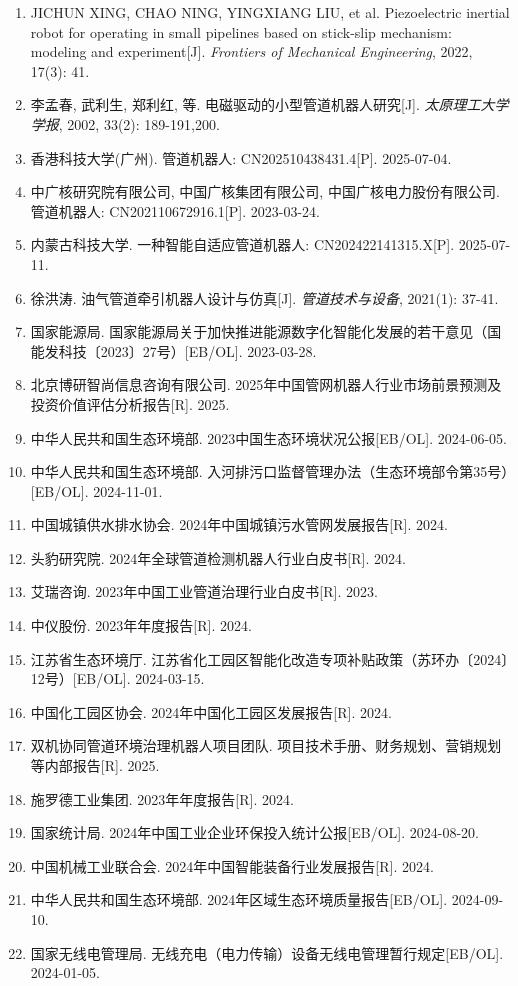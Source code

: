 \documentclass[12pt, a4paper]{article}
\begin{document}
\begin{enumerate}
    \item JICHUN XING, CHAO NING, YINGXIANG LIU, et al. Piezoelectric inertial robot for operating in small pipelines based on stick-slip mechanism: modeling and experiment[J]. \textit{Frontiers of Mechanical Engineering}, 2022, 17(3): 41.
    \item 李孟春, 武利生, 郑利红, 等. 电磁驱动的小型管道机器人研究[J]. \textit{太原理工大学学报}, 2002, 33(2): 189-191,200.
    \item 香港科技大学(广州). 管道机器人: CN202510438431.4[P]. 2025-07-04.
    \item 中广核研究院有限公司, 中国广核集团有限公司, 中国广核电力股份有限公司. 管道机器人: CN202110672916.1[P]. 2023-03-24.
    \item 内蒙古科技大学. 一种智能自适应管道机器人: CN202422141315.X[P]. 2025-07-11.
    \item 徐洪涛. 油气管道牵引机器人设计与仿真[J]. \textit{管道技术与设备}, 2021(1): 37-41.
    \item 国家能源局. 国家能源局关于加快推进能源数字化智能化发展的若干意见（国能发科技〔2023〕27号）[EB/OL]. 2023-03-28.
    \item 北京博研智尚信息咨询有限公司. 2025年中国管网机器人行业市场前景预测及投资价值评估分析报告[R]. 2025.
    \item 中华人民共和国生态环境部. 2023中国生态环境状况公报[EB/OL]. 2024-06-05.
    \item 中华人民共和国生态环境部. 入河排污口监督管理办法（生态环境部令第35号）[EB/OL]. 2024-11-01.
    \item 中国城镇供水排水协会. 2024年中国城镇污水管网发展报告[R]. 2024.
    \item 头豹研究院. 2024年全球管道检测机器人行业白皮书[R]. 2024.
    \item 艾瑞咨询. 2023年中国工业管道治理行业白皮书[R]. 2023.
    \item 中仪股份. 2023年年度报告[R]. 2024.
    \item 江苏省生态环境厅. 江苏省化工园区智能化改造专项补贴政策（苏环办〔2024〕12号）[EB/OL]. 2024-03-15.
    \item 中国化工园区协会. 2024年中国化工园区发展报告[R]. 2024.
    \item 双机协同管道环境治理机器人项目团队. 项目技术手册、财务规划、营销规划等内部报告[R]. 2025.
    \item 施罗德工业集团. 2023年年度报告[R]. 2024.
    \item 国家统计局. 2024年中国工业企业环保投入统计公报[EB/OL]. 2024-08-20.
    \item 中国机械工业联合会. 2024年中国智能装备行业发展报告[R]. 2024.
    \item 中华人民共和国生态环境部. 2024年区域生态环境质量报告[EB/OL]. 2024-09-10.
    \item 国家无线电管理局. 无线充电（电力传输）设备无线电管理暂行规定[EB/OL]. 2024-01-05.
\end{enumerate}
\end{document}
